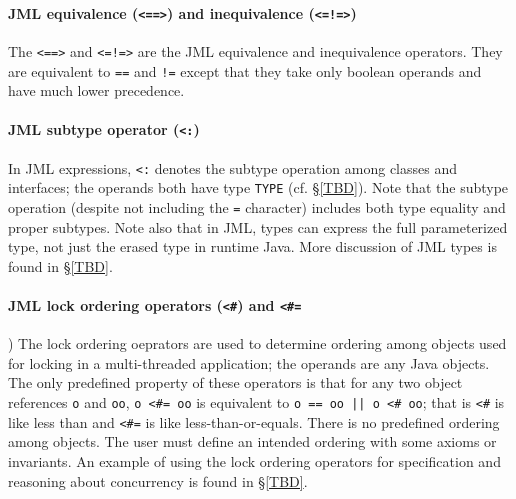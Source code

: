 \paragraph{JML equivalence (\texttt{<==>}) and inequivalence (\texttt{<=!=>})}
\label{JMLequivalence}

The \texttt{<==>} and \texttt{<=!=>} are the JML equivalence and inequivalence operators. They are equivalent to 
\texttt{==} and \texttt{!=} except that they take only boolean operands and have much lower precedence.

\paragraph{JML subtype operator (\texttt{<:})}
\label{JMLsubtype}
In JML expressions, \texttt{<:} denotes the subtype operation among classes and interfaces; the operands both have type \texttt{\bs TYPE} (cf. \S\ref{TBD}). Note that the subtype operation (despite not including the \texttt{=} character) includes both type equality and proper subtypes. Note also that in JML, types can express the full parameterized type, not just the erased type in runtime Java. More discussion of JML types is found in \S\ref{TBD}.

\paragraph{JML lock ordering operators (\texttt{<\#}) and \texttt{<\#=}})
\label{JMLlockorder}
The lock ordering oeprators are used to determine ordering among objects used for locking in a multi-threaded application; the operands are any Java objects. The only predefined property of these operators is that for any two 
object references \texttt{o} and \texttt{oo}, \texttt{o <\#= oo} is equivalent to \texttt{o == oo || o <\# oo}; that is \texttt{<\#} is like less than and \texttt{<\#=} is like less-than-or-equals. There is no predefined ordering among objects. The user must define an intended ordering with some axioms or invariants. An example of using the lock ordering operators for specification and reasoning about concurrency is found in \S\ref{TBD}.

